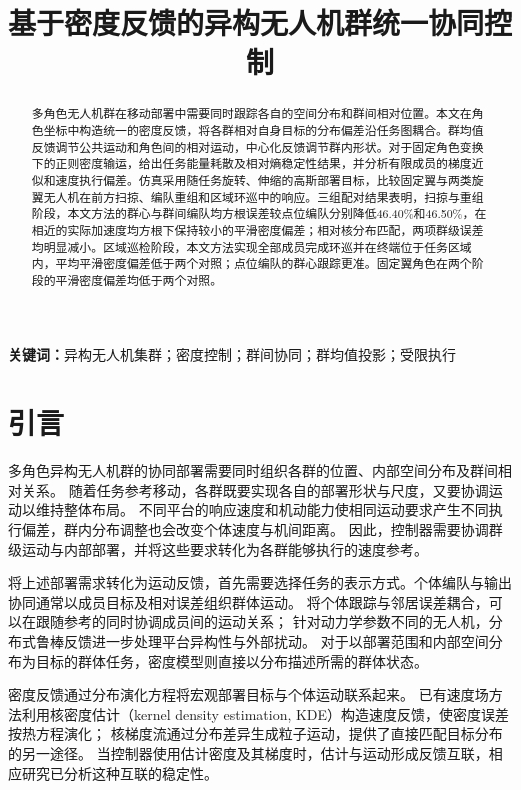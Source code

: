 \documentclass[UTF8,a4paper,11pt,fontset=none]{ctexart}
\title{\bfseries\color{ink}基于密度反馈的异构无人机群统一协同控制}
\author{}\date{}
\begin{document}
\maketitle\vspace{-2em}
\begin{abstract}
多角色无人机群在移动部署中需要同时跟踪各自的空间分布和群间相对位置。本文在角色坐标中构造统一的密度反馈，将各群相对自身目标的分布偏差沿任务图耦合。群均值反馈调节公共运动和角色间的相对运动，中心化反馈调节群内形状。对于固定角色变换下的正则密度输运，给出任务能量耗散及相对熵稳定性结果，并分析有限成员的梯度近似和速度执行偏差。仿真采用随任务旋转、伸缩的高斯部署目标，比较固定翼与两类旋翼无人机在前方扫掠、编队重组和区域环巡中的响应。三组配对结果表明，扫掠与重组阶段，本文方法的群心与群间编队均方根误差较点位编队分别降低46.40\%和46.50\%，在相近的实际加速度均方根下保持较小的平滑密度偏差；相对核分布匹配，两项群级误差均明显减小。区域巡检阶段，本文方法实现全部成员完成环巡并在终端位于任务区域内，平均平滑密度偏差低于两个对照；点位编队的群心跟踪更准。固定翼角色在两个阶段的平滑密度偏差均低于两个对照。

\end{abstract}
\noindent\textbf{关键词：}异构无人机集群；密度控制；群间协同；群均值投影；受限执行

\section{引言}
多角色异构无人机群的协同部署需要同时组织各群的位置、内部空间分布及群间相对关系。
随着任务参考移动，各群既要实现各自的部署形状与尺度，又要协调运动以维持整体布局。
不同平台的响应速度和机动能力使相同运动要求产生不同执行偏差，群内分布调整也会改变个体速度与机间距离。
因此，控制器需要协调群级运动与内部部署，并将这些要求转化为各群能够执行的速度参考。

将上述部署需求转化为运动反馈，首先需要选择任务的表示方式。个体编队与输出协同通常以成员目标及相对误差组织群体运动。
将个体跟踪与邻居误差耦合，可以在跟随参考的同时协调成员间的运动关系\cite{ren2008}；
针对动力学参数不同的无人机，分布式鲁棒反馈进一步处理平台异构性与外部扰动\cite{imran2024}。
对于以部署范围和内部空间分布为目标的群体任务，密度模型则直接以分布描述所需的群体状态。

密度反馈通过分布演化方程将宏观部署目标与个体运动联系起来。
已有速度场方法利用核密度估计（kernel density estimation, KDE）构造速度反馈，使密度误差按热方程演化\cite{eren2017}；
核梯度流通过分布差异生成粒子运动，提供了直接匹配目标分布的另一途径\cite{arbel2019}。
当控制器使用估计密度及其梯度时，估计与运动形成反馈互联，相应研究已分析这种互联的稳定性\cite{zheng2022feedback}。
\end{document}
